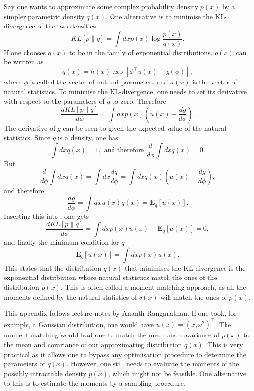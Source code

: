 Say one wants to approximate some complex probability density $p(x)$ by a simpler parametric density $q(x)$. One
alternative is to minimise the KL-divergence of the two densities
\[
KL[p\|q] = \int dx p(x) \log \frac{p(x)}{q(x)}.
\]
If one chooses $q(x)$ to be in the family of exponential distributions, $q(x)$ can be written as
\[
q(x) = h(x) \exp\left[\phi^\top u(x)-g(\phi) \right],
\]
where $\phi$ is called the vector of natural parameters and $u(x)$ is the vector of natural statistics. To minimise the KL-divergence, one needs to set its derivative with respect to the 
parameters of $q$ to zero. Therefore
\begin{equation}
\label{eq:min_KL}
\frac{d KL[p\|q]}{d\phi} = \int dx p(x) \left(u(x) - \frac{d g}{d\phi}\right).
\end{equation}
The derivative of $g$ can be seen to given the expected value of the natural statistics. Since $q$ is a density, one has
\[
\int dx q(x) = 1,\textrm{ and therefore } \frac{d}{d\phi} \int dx q(x) = 0.
\]
But
\[
\frac{d}{d\phi} \int dx q(x) = \int dx \frac{dq}{d\phi} = \int dx q(x)\left(u(x) - \frac{dg}{d\phi}\right),
\]
and therefore
\[
\frac{dg}{d\phi} = \int dx u(x) q(x) = \boldsymbol{E}_q\left[u(x)\right].
\]
Inserting this into , one gets
\[
\frac{d KL[p\|q]}{d\phi} = \int dx p(x)u(x) -\boldsymbol{E}_q\left[u(x)\right]= 0,
\]
and finally the minimum condition for $q$
\[
\boldsymbol{E}_q\left[u(x)\right] = \int dx p(x) u(x).
\]
This states that the distribution $q(x)$ that minimises the KL-divergence is the exponential distribution whose natural statistics match the ones of the distribution $p(x)$. This is
often called a moment matching approach, as all the moments defined by the natural statistics of $q(x)$ will match the ones of $p(x)$.\par
This appendix follows lecture notes by Ananth Ranganathan. If one took, for example, a Gaussian distribution, one would have $u(x) = (x,x^2)^\top$. The moment
matching would lead one to match the mean and covariance of $p(x)$ to the mean and covariance of our approximating distribution $q(x)$. This is very practical as it allows
one to bypass any optimisation procedure to determine the parameters of $q(x)$. However, one still needs to evaluate the moments of the possibly intractable density $p(x)$, which
might not be feasible. One alternative to this is to estimate the moments by a sampling procedure.